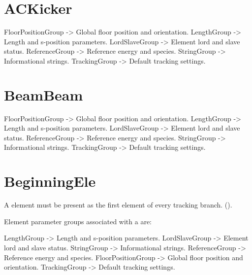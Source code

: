 \newpage

\section{ACKicker}
\label{s:ackicker}

\begin{example}
  FloorPositionGroup   ->  Global floor position and orientation.
  LengthGroup          ->  Length and s-position parameters.
  LordSlaveGroup       ->  Element lord and slave status.
  ReferenceGroup       ->  Reference energy and species.
  StringGroup          ->  Informational strings.
  TrackingGroup        ->  Default tracking settings.
\end{example}

\newpage

\section{BeamBeam}
\label{s:beambeam}

\begin{example}
  FloorPositionGroup   ->  Global floor position and orientation.
  LengthGroup          ->  Length and s-position parameters.
  LordSlaveGroup       ->  Element lord and slave status.
  ReferenceGroup       ->  Reference energy and species.
  StringGroup          ->  Informational strings.
  TrackingGroup        ->  Default tracking settings.
\end{example}

\newpage

\section{BeginningEle}
\label{s:begin.ele}

A  element must be present as the first element of every tracking branch.
().

Element parameter groups associated with a  are:
\begin{example}
  LengthGroup          ->      Length and s-position parameters.
  LordSlaveGroup       ->  Element lord and slave status.
  StringGroup          ->      Informational strings.
  ReferenceGroup       ->   Reference energy and species.
  FloorPositionGroup   ->   Global floor position and orientation.
  TrackingGroup        ->    Default tracking settings.
\end{example}


